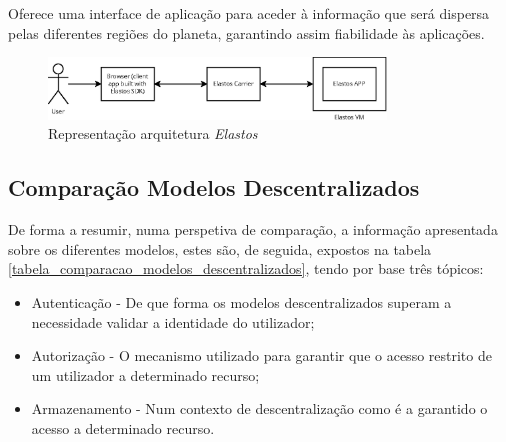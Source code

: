 Oferece uma interface de aplicação para aceder à informação que será dispersa pelas diferentes regiões do planeta, garantindo assim fiabilidade às aplicações.\cite{elastos_white_paper}

\begin{figure}[H]
    \begin{center}
        \includegraphics[width=0.8\textwidth]{figures/estado_arte-Elastos.eps}
        \caption{Representação arquitetura \emph{Elastos}}
        \label{estado_arte_representacao_elastos}
    \end{center}
\end{figure}

\subsection{Comparação Modelos Descentralizados}

De forma a resumir, numa perspetiva de comparação, a informação apresentada sobre os diferentes modelos, estes são, de seguida, expostos na  tabela \ref{tabela_comparacao_modelos_descentralizados}, tendo por base três tópicos:
\begin{itemize}
    \item Autenticação - De que forma os modelos descentralizados superam a necessidade validar a identidade do utilizador;
    \item Autorização - O mecanismo utilizado para garantir que o acesso restrito de um utilizador a determinado recurso;
    \item Armazenamento - Num contexto de descentralização como é a garantido o acesso a determinado recurso.
\end{itemize}


